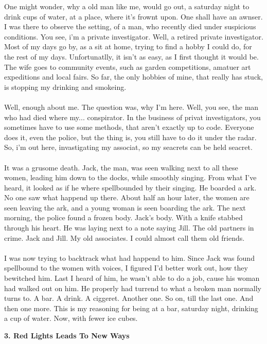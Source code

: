 \documentclass[]{article}
\begin{document}
One might wonder, why a old man like me, would go out, a saturday night to drink cups of water, at a place, where it's frownt upon. One shall have an awnser. I was there to observe the setting, of a man, who recently died under suspicious conditions. You see, i'm a private investigator. Well, a retired private investigator. Most of my days go by, as a sit at home, trying to find a hobby I could do, for the rest of my days. Unfortunatlly, it isn't as easy, as I first thought it would be. The wife goes to community events, such as garden competitions, amatuer art expeditions and local fairs. So far, the only hobbies of mine, that really has stuck, is stopping my drinking and smokeing. 
\\ \\
Well, enough about me. The question was, why I'm here. Well, you see, the man who had died where my... conspirator. In the business of privat investigators, you sometimes have to use some methods, that aren't exactly up to code. Everyone does it, even the police, but the thing is, you still have to do it under the radar. So, i'm out here, invastigating my associat, so my seacrets can be held seacret.
\\ \\
It was a grusome death. Jack, the man, was seen walking next to all these women, leading him down to the docks, while smoothly singing. From what I've heard, it looked as if he where spellbounded by their singing. He boarded a ark. No one saw what happend up there. About half an hour later, the women are seen leaving the ark, and a young woman is seen boarding the ark. The next morning, the police found a frozen body. Jack's body. With a knife stabbed through his heart. He was laying next to a note saying Jill. The old partners in crime. Jack and Jill. My old associates. I could almost call them old friends.
\\ \\
I was now trying to backtrack what had happend to him. Since Jack was found spellbound to the women with voices, I figured I'd better work out, how they bewitched him. Last I heard of him, he wasn't able to do a job, cause his woman had walked out on him. He properly had turrend to what a broken man normally turns to. A bar. A drink. A ciggeret. Another one. So on, till the last one. And then one more. This is my reasoning for being at a bar, saturday night, drinking a cup of water. Now, with fewer ice cubes.


\begin{center}
	\large\textbf{3. Red Lights Leads To New Ways}
\end{center}
\end{document}
